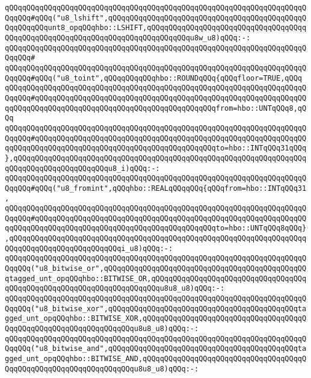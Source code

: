 \verb|qQQqqQQqqQQqqQQqqQQqqQQqqQQqqQQqqQQqqQQqqQQqqQQqqQQqqQQqqQQqqQQqqQQqqQQqqQQq#qQQq("u8_lshift",qQQqqQQqqQQqqQQqqQQqqQQqqQQqqQQqqQQqqQQqqQQqqQQqqQQqqQQqunt8_opqQQqhbo::LSHIFT,qQQqqQQqqQQqqQQqqQQqqQQqqQQqqQQqqQQqqQQqqQQqqQQqqQQqqQQqqQQqqQQqqQQqqQQqqQQqqQQqu8w_u8)qQQq:-:|\newline
\verb|qQQqqQQqqQQqqQQqqQQqqQQqqQQqqQQqqQQqqQQqqQQqqQQqqQQqqQQqqQQqqQQqqQQqqQQqqQQq#|\newline
\verb|qQQqqQQqqQQqqQQqqQQqqQQqqQQqqQQqqQQqqQQqqQQqqQQqqQQqqQQqqQQqqQQqqQQqqQQqqQQq#qQQq("u8_toint",qQQqqQQqqQQqhbo::ROUNDqQQq{qQQqfloor=TRUE,qQQq|\newline
\verb|qQQqqQQqqQQqqQQqqQQqqQQqqQQqqQQqqQQqqQQqqQQqqQQqqQQqqQQqqQQqqQQqqQQqqQQqqQQq#qQQqqQQqqQQqqQQqqQQqqQQqqQQqqQQqqQQqqQQqqQQqqQQqqQQqqQQqqQQqqQQqqQQqqQQqqQQqqQQqqQQqqQQqqQQqqQQqqQQqqQQqqQQqqQQqfrom=hbo::UNTqQQq8,qQQq|\newline
\verb|qQQqqQQqqQQqqQQqqQQqqQQqqQQqqQQqqQQqqQQqqQQqqQQqqQQqqQQqqQQqqQQqqQQqqQQqqQQq#qQQqqQQqqQQqqQQqqQQqqQQqqQQqqQQqqQQqqQQqqQQqqQQqqQQqqQQqqQQqqQQqqQQqqQQqqQQqqQQqqQQqqQQqqQQqqQQqqQQqqQQqqQQqqQQqto=hbo::INTqQQq31qQQq},qQQqqQQqqQQqqQQqqQQqqQQqqQQqqQQqqQQqqQQqqQQqqQQqqQQqqQQqqQQqqQQqqQQqqQQqqQQqqQQqqQQqqQQqqQQqu8_i)qQQq:-:|\newline
\verb|qQQqqQQqqQQqqQQqqQQqqQQqqQQqqQQqqQQqqQQqqQQqqQQqqQQqqQQqqQQqqQQqqQQqqQQqqQQq#qQQq("u8_fromint",qQQqhbo::REALqQQqqQQq{qQQqfrom=hbo::INTqQQq31,|\newline
\verb|qQQqqQQqqQQqqQQqqQQqqQQqqQQqqQQqqQQqqQQqqQQqqQQqqQQqqQQqqQQqqQQqqQQqqQQqqQQq#qQQqqQQqqQQqqQQqqQQqqQQqqQQqqQQqqQQqqQQqqQQqqQQqqQQqqQQqqQQqqQQqqQQqqQQqqQQqqQQqqQQqqQQqqQQqqQQqqQQqqQQqqQQqqQQqto=hbo::UNTqQQq8qQQq},qQQqqQQqqQQqqQQqqQQqqQQqqQQqqQQqqQQqqQQqqQQqqQQqqQQqqQQqqQQqqQQqqQQqqQQqqQQqqQQqqQQqqQQqqQQqqQQqi_u8)qQQq:-:|\newline
\newline
\newline
\verb|qQQqqQQqqQQqqQQqqQQqqQQqqQQqqQQqqQQqqQQqqQQqqQQqqQQqqQQqqQQqqQQqqQQqqQQqqQQq("u8_bitwise_or",qQQqqQQqqQQqqQQqqQQqqQQqqQQqqQQqqQQqqQQqqQQqqQQqtagged_unt_opqQQqhbo::BITWISE_OR,qQQqqQQqqQQqqQQqqQQqqQQqqQQqqQQqqQQqqQQqqQQqqQQqqQQqqQQqqQQqqQQqqQQqqQQqu8u8_u8)qQQq:-:|\newline
\verb|qQQqqQQqqQQqqQQqqQQqqQQqqQQqqQQqqQQqqQQqqQQqqQQqqQQqqQQqqQQqqQQqqQQqqQQqqQQq("u8_bitwise_xor",qQQqqQQqqQQqqQQqqQQqqQQqqQQqqQQqqQQqqQQqqQQqtagged_unt_opqQQqhbo::BITWISE_XOR,qQQqqQQqqQQqqQQqqQQqqQQqqQQqqQQqqQQqqQQqqQQqqQQqqQQqqQQqqQQqqQQqqQQqu8u8_u8)qQQq:-:|\newline
\verb|qQQqqQQqqQQqqQQqqQQqqQQqqQQqqQQqqQQqqQQqqQQqqQQqqQQqqQQqqQQqqQQqqQQqqQQqqQQq("u8_bitwise_and",qQQqqQQqqQQqqQQqqQQqqQQqqQQqqQQqqQQqqQQqqQQqtagged_unt_opqQQqhbo::BITWISE_AND,qQQqqQQqqQQqqQQqqQQqqQQqqQQqqQQqqQQqqQQqqQQqqQQqqQQqqQQqqQQqqQQqqQQqu8u8_u8)qQQq:-:|\newline
